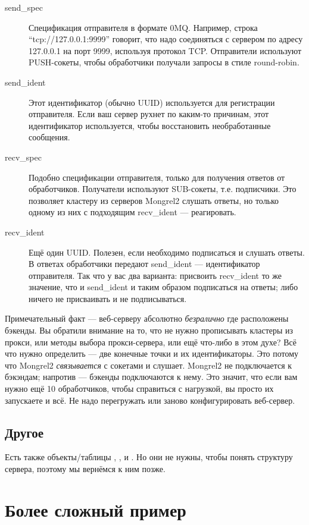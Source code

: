 \begin{description}
\item[send\_spec] Спецификация отправителя в формате 0MQ. Например,
    строка ``tcp://127.0.0.1:9999'' говорит, что надо соединяться с
    сервером по адресу 127.0.0.1 на порт 9999, используя протокол TCP.
    Отправители используют PUSH-сокеты, чтобы обработчики получали запросы
    в стиле round-robin.
\item[send\_ident] Этот идентификатор (обычно UUID) используется для
    регистрации отправителя. Если ваш сервер рухнет по каким-то причинам,
    этот идентификатор используется, чтобы восстановить необработанные
    сообщения.
\item[recv\_spec] Подобно спецификации отправителя, только для
    получения ответов от обработчиков. Получатели используют SUB-сокеты,
    т.е. подписчики. Это позволяет кластеру из серверов Mongrel2 слушать
    ответы, но только одному из них с подходящим recv\_ident --- реагировать.
\item[recv\_ident] Ещё один UUID. Полезен, если необходимо подписаться
    и слушать ответы. В ответах обработчики передают send\_ident ---
    идентификатор отправителя. Так что у вас два варианта: присвоить
    recv\_ident то же значение, что и send\_ident и таким образом
    подписаться на ответы; либо ничего не присваивать и не подписываться.
\end{description}

Примечательный факт --- веб-серверу абсолютно \emph{безралично} где
расположены бэкенды. Вы обратили внимание на то, что не нужно
прописывать кластеры из прокси, или методы выбора прокси-сервера, или
ещё что-либо в этом духе? Всё что нужно определить --- две конечные
точки и их идентификаторы. Это потому что Mongrel2 \emph{связывается}
с сокетами и слушает. Mongrel2 не подключается к бэкэндам; напротив
--- бэкенды подключаются к нему. Это значит, что если вам нужно ещё 10
обработчиков, чтобы справиться с нагрузкой, вы просто их запускаете и
всё. Не надо перегружать или заново конфигурировать веб-сервер.

\subsection{Другое}

Есть также объекты/таблицы , , и
. Но они не нужны, чтобы понять структуру сервера,
поэтому мы вернёмся к ним позже.

\section{Более сложный пример}

